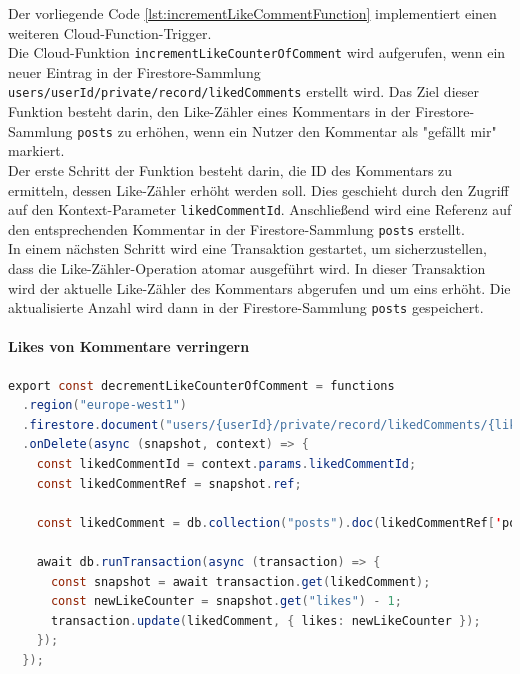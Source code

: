Der vorliegende Code \ref{lst:incrementLikeCommentFunction} implementiert einen weiteren Cloud-Function-Trigger.
\\
Die Cloud-Funktion \texttt{incrementLikeCounterOfComment} wird aufgerufen, wenn ein neuer Eintrag in der Firestore-Sammlung \texttt{users/{userId}/private/record/likedComments} erstellt wird. Das Ziel dieser Funktion besteht darin, den Like-Zähler eines Kommentars in der Firestore-Sammlung \texttt{posts} zu erhöhen, wenn ein Nutzer den Kommentar als "gefällt mir" markiert.
\\
Der erste Schritt der Funktion besteht darin, die ID des Kommentars zu ermitteln, dessen Like-Zähler erhöht werden soll. Dies geschieht durch den Zugriff auf den Kontext-Parameter \texttt{likedCommentId}. Anschließend wird eine Referenz auf den entsprechenden Kommentar in der Firestore-Sammlung \texttt{posts} erstellt.
\\
In einem nächsten Schritt wird eine Transaktion gestartet, um sicherzustellen, dass die Like-Zähler-Operation atomar ausgeführt wird. In dieser Transaktion wird der aktuelle Like-Zähler des Kommentars abgerufen und um eins erhöht. Die aktualisierte Anzahl wird dann in der Firestore-Sammlung \texttt{posts} gespeichert.

\paragraph{Likes von Kommentare verringern}

\begin{lstlisting}[language=Java,caption=decrementLikeCounterOfComment Funktion,label=lst:decrementLikeCommentFunction]
  export const decrementLikeCounterOfComment = functions
  .region("europe-west1")
  .firestore.document("users/{userId}/private/record/likedComments/{likedCommentId}")
  .onDelete(async (snapshot, context) => {
    const likedCommentId = context.params.likedCommentId;
    const likedCommentRef = snapshot.ref;

    const likedComment = db.collection("posts").doc(likedCommentRef['post']).collection('comments').doc(likedCommentId);

    await db.runTransaction(async (transaction) => {
      const snapshot = await transaction.get(likedComment);
      const newLikeCounter = snapshot.get("likes") - 1;
      transaction.update(likedComment, { likes: newLikeCounter });
    });
  });
\end{lstlisting}

